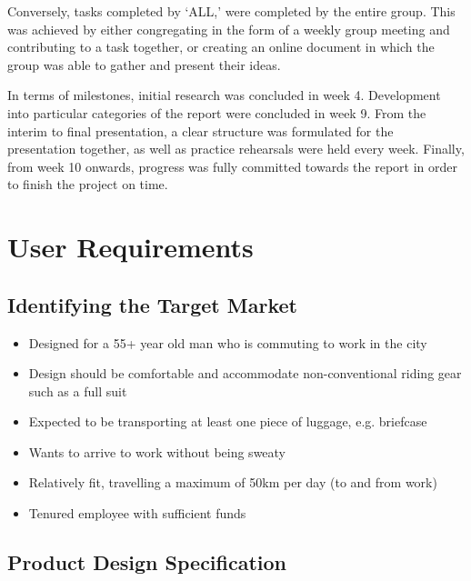 \documentclass[a4paper,11pt]{article}
\begin{document}
Conversely, tasks completed by `ALL,' were completed by the entire group. This was achieved by either congregating in the form of a weekly group meeting and contributing to a task together, or creating an online document in which the group was able to gather and present their ideas.

In terms of milestones, initial research was concluded in week 4. Development into particular categories of the report were concluded in week 9. From the interim to final presentation, a clear structure was formulated for the presentation together, as well as practice rehearsals were held every week. Finally, from week 10 onwards, progress was fully committed towards the report in order to finish the project on time.

\section{User Requirements}

\subsection{Identifying the Target Market}

\begin{itemize}
	\setlength{\itemsep}{0pt}
	\item Designed for a 55+ year old man who is commuting to work in the city
	\item Design should be comfortable and accommodate non-conventional riding gear such as a full suit
	\item Expected to be transporting at least one piece of luggage, e.g. briefcase
	\item Wants to arrive to work without being sweaty
	\item Relatively fit, travelling a maximum of 50km per day (to and from work)
	\item Tenured employee with sufficient funds
\end{itemize}

\subsection{Product Design Specification}
\label{sec:pds}
\end{document}
